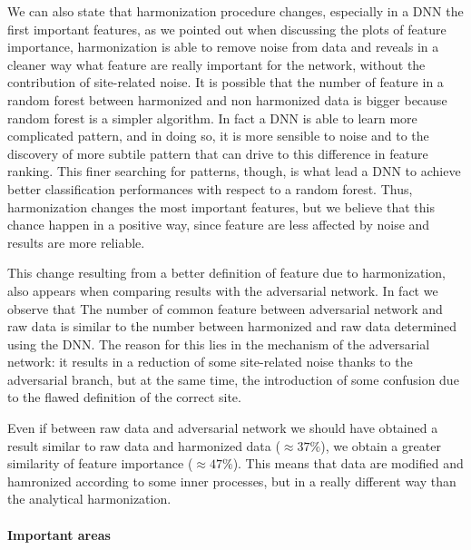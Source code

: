 \documentclass[11pt]{report}
\begin{document}
We can also state that harmonization procedure changes, especially in a DNN the first important features, as we pointed out when discussing the plots of feature importance, harmonization is able to remove noise from data and reveals in a cleaner way what feature are really important for the network, without the contribution of site-related noise.
It is possible that the number of feature in a random forest between harmonized and non harmonized data is bigger because random forest is a simpler algorithm.
In fact a DNN is able to learn more complicated pattern, and in doing so, it is more sensible to noise and to the discovery of more subtile pattern that can drive to this difference in feature ranking.
This finer searching for patterns, though, is what lead a DNN to achieve better classification performances with respect to a random forest.
Thus, harmonization changes the most important features, but we believe that this chance happen in a positive way, since feature are less affected by noise and results are more reliable.

This change resulting from a better definition of feature due to harmonization, also appears when comparing results with the adversarial network.
In fact we observe that
The number of common feature between adversarial network and raw data is similar to the number between harmonized and raw data determined using the DNN.
The reason for this lies in the mechanism of the adversarial network: it results in a reduction of some site-related noise thanks to the adversarial branch, but at the same time, the introduction of some confusion due to the flawed definition of the correct site.

Even if between raw data and adversarial network we should have obtained a result similar to raw data and harmonized data ($\approx 37\%$), we obtain a greater similarity of feature importance ($\approx 47\%$).
This means that data are modified and hamronized according to some inner processes, but in a really different way than the analytical harmonization.

\paragraph{Important areas} \hfill
\end{document}
